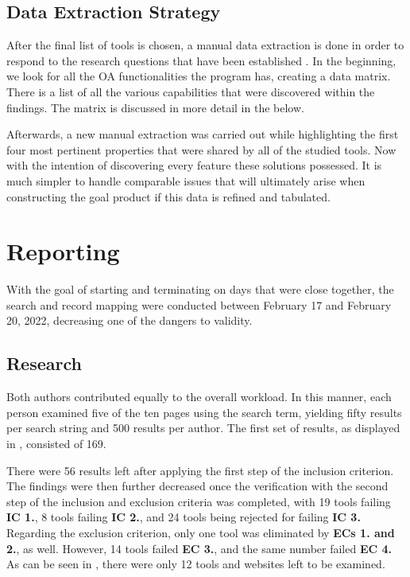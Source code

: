 

\subsection{Data Extraction Strategy}\label{sec:gl-planning-datastrategy}

After the final list of tools is chosen, a manual data extraction is done in order to respond to the research questions that have been established . In the beginning, we look for all the \ac{OA} functionalities the program has, creating a data matrix. There is a list of all the various capabilities that were discovered within the findings. The matrix is discussed in more detail in the  below.

Afterwards, a new manual extraction was carried out while highlighting the first four most pertinent properties that were shared by all of the studied tools. Now with the intention of discovering every feature these solutions possessed. It is much simpler to handle comparable issues that will ultimately arise when constructing the goal product if this data is refined and tabulated.

\section{Reporting}\label{sec:gl-reporting}

With the goal of starting and terminating on days that were close together, the search and record mapping were conducted between February 17 and February 20, 2022, decreasing one of the dangers to validity.

\subsection{Research}\label{sec:gl-research}

Both authors contributed equally to the overall workload. In this manner, each person examined five of the ten pages using the search term, yielding fifty results per search string and 500 results per author. The first set of results, as displayed in , consisted of 169.

There were 56 results left after applying the first step of the inclusion criterion. The findings were then further decreased once the verification with the second step of the inclusion and exclusion criteria was completed, with 19 tools failing \textbf{IC 1.}, 8 tools failing \textbf{IC 2.}, and 24 tools being rejected for failing \textbf{IC 3.} Regarding the exclusion criterion, only one tool was eliminated by \textbf{ECs 1. and 2.}, as well. However, 14 tools failed \textbf{EC 3.}, and the same number failed \textbf{EC 4.} As can be seen in , there were only 12 tools and websites left to be examined.

